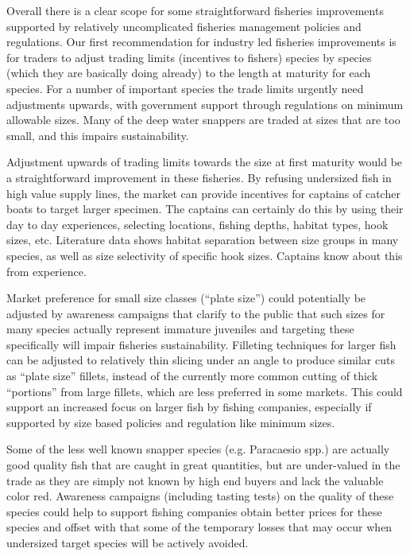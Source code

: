 Overall there is a clear scope for some straightforward fisheries improvements supported by relatively uncomplicated fisheries management policies and regulations. Our first recommendation for industry led fisheries improvements is for traders to adjust trading limits (incentives to fishers) species by species (which they are basically doing already) to the length at maturity for each species. For a number of important species the trade limits urgently need adjustments upwards, with government support through regulations on minimum allowable sizes. Many of the deep water snappers are traded at sizes that are too small, and this impairs sustainability.

Adjustment upwards of trading limits towards the size at first maturity would be a straightforward improvement in these fisheries. By refusing undersized fish in high value supply lines, the market can provide incentives for captains of catcher boats to target larger specimen. The captains can certainly do this by using their day to day experiences, selecting locations, fishing depths, habitat types, hook sizes, etc. Literature data shows habitat separation between size groups in many species, as well as size selectivity of specific hook sizes. Captains know about this from experience.

Market preference for small size classes (``plate size'') could potentially be adjusted by awareness campaigns that clarify to the public that such sizes for many species actually represent immature juveniles and targeting these specifically will impair fisheries sustainability. Filleting techniques for larger fish can be adjusted to relatively thin slicing under an angle to produce similar cuts as ``plate size'' fillets, instead of the currently more common cutting of thick ``portions'' from large fillets, which are less preferred in some markets. This could support an increased focus on larger fish by fishing companies, especially if supported by size based policies and regulation like minimum sizes.

Some of the less well known snapper species (e.g. Paracaesio spp.) are actually good quality fish that are caught in great quantities, but are under-valued in the trade as they are simply not known by high end buyers and lack the valuable color red. Awareness campaigns (including tasting tests) on the quality of these species could help to support fishing companies obtain better prices for these species and offset with that some of the temporary losses that may occur when undersized target species will be actively avoided.

